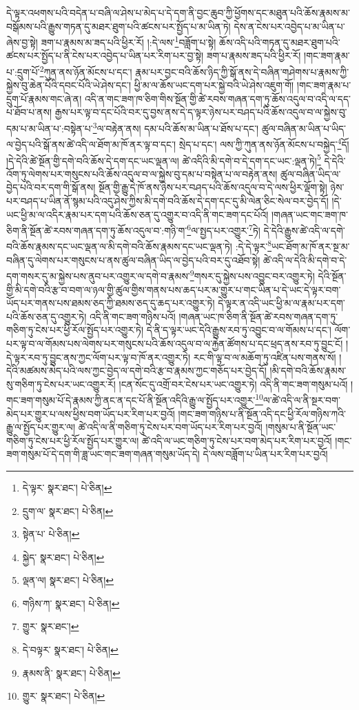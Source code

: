 དེ་ལྟར་འཕགས་པའི་བདེན་པ་བཞི་ལ་ཤེས་པ་མེད་པ་དེ་དག་ནི་བྱང་ཆུབ་ཀྱི་ཕྱོགས་དང་མཐུན་པའི་ཆོས་རྣམས་མ་བསྒོམས་པའི་རྒྱུས་གཏན་དུ་མཐར་ཐུག་པའི་ཚངས་པར་སྤྱོད་པ་མ་ཡིན་ཏེ། དེས་ན་ངེས་པར་འབྱེད་པ་མ་ཡིན་པ་ཞེས་བྱ་སྟེ། ཟག་པ་རྣམས་མ་ཟད་པའི་ཕྱིར་རོ། །:དེ་ལས་\footnote{དེ་ལྟར་  སྣར་ཐང་།  པེ་ཅིན། }བཟློག་པ་སྟེ། ཆོས་འདི་པའི་གཏན་དུ་མཐར་ཐུག་པའི་ཚངས་པར་སྤྱོད་པ་ནི་ངེས་པར་འབྱེད་པ་ཡིན་པར་རིག་པར་བྱ་སྟེ། ཟག་པ་རྣམས་ཟད་པའི་ཕྱིར་རོ། །གང་ཟག་རྣམ་པ་:དྲུག་པོ་\footnote{དྲུག་ལ་  སྣར་ཐང་།  པེ་ཅིན། }ཀུན་ནས་ཉོན་མོངས་པ་དང་། རྣམ་པར་བྱང་བའི་ཆོས་ཉིད་ཀྱི་སྒོ་ནས་དེ་བཞིན་གཤེགས་པ་རྣམས་ཀྱི་སྐྱེས་བུ་ཆེན་པོའི་དབང་པོའི་ཡེ་ཤེས་དང་། ཕྱི་མ་ལ་ཆོས་ཡང་དག་པར་སྐྱེ་བའི་ཡེ་ཤེས་འཇུག་གོ། །གང་ཟག་རྣམ་པ་དྲུག་པོ་རྣམས་གང་ཞེ་ན། འདི་ན་གང་ཟག་ཁ་ཅིག་གིས་སྔོན་གྱི་ཚེ་རབས་གཞན་དག་ཏུ་ཆོས་འདུལ་བ་འདི་ལ་དད་པ་ཐོབ་པ་ནས། རྒྱས་པར་ལྟ་བ་དང་པོའི་བར་དུ་བྱས་ནས་དེ་ད་ལྟར་ཉེས་པར་བཤད་པའི་ཆོས་འདུལ་བ་ལ་སྐྱེས་བུ་དམ་པ་མ་ཡིན་པ་:བསྟེན་པ་\footnote{སྟེན་པ་  པེ་ཅིན། }ལ་བརྟེན་ནས། དམ་པའི་ཆོས་མ་ཡིན་པ་ཐོས་པ་དང་། ཚུལ་བཞིན་མ་ཡིན་པ་ཡིད་ལ་བྱེད་པའི་སྒོ་ནས་ཚེ་འདི་ལ་ཐོག་མ་ཁོ་ནར་ལྟ་བ་དང་། སྲེད་པ་དང་། ལས་ཀྱི་ཀུན་ནས་ཉོན་མོངས་པ་བསྐྱེད་\footnote{སྐྱེད་  སྣར་ཐང་།  པེ་ཅིན། }དོ། །དེ་དེའི་ཚེ་སྔོན་གྱི་དགེ་བའི་ཆོས་དེ་དག་དང་ཡང་ལྡན་ལ། ཚེ་འདིའི་མི་དགེ་བ་དེ་དག་དང་ཡང་:ལྡན་ཏེ།\footnote{ལྡན་ལ།  སྣར་ཐང་།  པེ་ཅིན། } དེ་དེའི་འོག་ཏུ་ལེགས་པར་གསུངས་པའི་ཆོས་འདུལ་བ་ལ་སྐྱེས་བུ་དམ་པ་བསྟེན་པ་ལ་བརྟེན་ནས། ཚུལ་བཞིན་ཡིད་ལ་བྱེད་པའི་བར་དག་གི་སྒོ་ནས། སྔོན་གྱི་རྒྱུ་དེ་ཁོ་ནས་ཉེས་པར་བཤད་པའི་ཆོས་འདུལ་བ་དེ་ལས་ཕྱིར་ལྡོག་སྟེ། ཉེས་པར་བཤད་པ་ཡིན་ནོ་སྙམ་པའི་འདུ་ཤེས་ཀྱིས་མི་དགེ་བའི་ཆོས་དེ་དག་དང་དུ་མི་ལེན་ཅིང་སེལ་བར་བྱེད་དོ། །དེ་ཡང་ཕྱི་མ་ལ་འདིར་རྣམ་པར་དག་པའི་ཆོས་ཅན་དུ་འགྱུར་བ་འདི་ནི་གང་ཟག་དང་པོའོ། །གཞན་ཡང་གང་ཟག་ཁ་ཅིག་ནི་སྔོན་ཚེ་རབས་གཞན་དག་ཏུ་ཆོས་འདུལ་བ་:གཉི་ག་\footnote{གཉིས་ཀ་  སྣར་ཐང་།  པེ་ཅིན། }ལ་སྤྱད་པར་འགྱུར་\footnote{གྱུར་  སྣར་ཐང་། }ཏེ། དེ་དེའི་རྒྱུས་ཚེ་འདི་ལ་དགེ་བའི་ཆོས་རྣམས་དང་ཡང་ལྡན་ལ་མི་དགེ་བའི་ཆོས་རྣམས་དང་ཡང་ལྡན་ཏེ། :དེ་དེ་ལྟར་\footnote{དེ་བལྟར་  སྣར་ཐང་།  པེ་ཅིན། }ཡང་ཐོག་མ་ཁོ་ནར་སྔ་མ་བཞིན་དུ་ལེགས་པར་གསུངས་པ་ནས་ཚུལ་བཞིན་ཡིད་ལ་བྱེད་པའི་བར་དུ་འཐོབ་སྟེ། ཚེ་འདི་ལ་དེའི་མི་དགེ་བ་དེ་དག་གསར་དུ་མ་སྐྱེས་པས་ནུབ་པར་འགྱུར་ལ་དགེ་བ་རྣམས་\footnote{རྣམས་ནི་  སྣར་ཐང་།  པེ་ཅིན། }གསར་དུ་སྐྱེས་པས་འབྱུང་བར་འགྱུར་ཏེ། དེའི་སྔོན་གྱི་མི་དགེ་བའི་རྩ་བ་བག་ལ་ཉལ་གྱི་ཚུལ་གྱིས་གནས་པས་ཆད་པར་མ་གྱུར་པ་གང་ཡིན་པ་དེ་ཡང་དེ་ལྟར་བག་ཡོད་པར་གནས་པས་ཐམས་ཅད་ཀྱི་ཐམས་ཅད་དུ་ཆད་པར་འགྱུར་ཏེ། དེ་ལྟར་ན་འདི་ཡང་ཕྱི་མ་ལ་རྣམ་པར་དག་པའི་ཆོས་ཅན་དུ་འགྱུར་ཏེ། འདི་ནི་གང་ཟག་གཉིས་པའོ། །གཞན་ཡང་ཁ་ཅིག་ནི་སྔོན་ཚེ་རབས་གཞན་དག་ཏུ་གཅིག་ཏུ་ངེས་པར་ཕྱི་རོལ་སྤྱོད་པར་འགྱུར་ཏེ། དེ་ནི་ད་ལྟར་ཡང་དེའི་རྒྱུས་རབ་ཏུ་འབྱུང་བ་ལ་གོམས་པ་དང་། ལོག་པར་ལྟ་བ་ལ་གོམས་པས་ལེགས་པར་གསུངས་པའི་ཆོས་འདུལ་བ་ལ་རྐྱེན་ཚོགས་པ་དང་ཕྲད་ནས་རབ་ཏུ་བྱུང་ངོ། །དེ་ལྟར་རབ་ཏུ་བྱུང་ནས་ཀྱང་ལོག་པར་ལྟ་བ་ཁོ་ནར་འགྱུར་ཏེ། རང་གི་ལྟ་བ་ལ་མཆོག་ཏུ་འཛིན་པས་གནས་སོ། །དེའི་མཚམས་མེད་པའི་ལས་ཀྱང་བྱེད་ལ་དགེ་བའི་རྩ་བ་རྣམས་ཀྱང་གཅོད་པར་བྱེད་དོ། །མི་དགེ་བའི་ཆོས་རྣམས་སུ་གཅིག་ཏུ་ངེས་པར་ཡང་འགྱུར་རོ། །ངན་སོང་དུ་འགྲོ་བར་ངེས་པར་ཡང་འགྱུར་ཏེ། འདི་ནི་གང་ཟག་གསུམ་པའོ། །གང་ཟག་གསུམ་པོ་དེ་རྣམས་ཀྱི་ནང་ན་དང་པོ་ནི་སྔོན་འདིའི་རྒྱུ་ལ་སྤྱོད་པར་འགྱུར་\footnote{གྱུར་  སྣར་ཐང་།  པེ་ཅིན། }ལ་ཚེ་འདི་ལ་ནི་སྔར་བག་མེད་པར་གྱུར་པ་ལས་ཕྱིས་བག་ཡོད་པར་རིག་པར་བྱའོ། །གང་ཟག་གཉིས་པ་ནི་སྔོན་འདི་དང་ཕྱི་རོལ་གཉིས་ཀའི་རྒྱུ་ལ་སྤྱོད་པར་གྱུར་ལ། ཚེ་འདི་ལ་ནི་གཅིག་ཏུ་ངེས་པར་བག་ཡོད་པར་རིག་པར་བྱའོ། །གསུམ་པ་ནི་སྔོན་ཡང་གཅིག་ཏུ་ངེས་པར་ཕྱི་རོལ་སྤྱོད་པར་གྱུར་ལ། ཚེ་འདི་ལ་ཡང་གཅིག་ཏུ་ངེས་པར་བག་མེད་པར་རིག་པར་བྱའོ། །གང་ཟག་གསུམ་པོ་དེ་དག་གི་ཟླ་ཡང་གང་ཟག་གཞན་གསུམ་ཡོད་དེ། དེ་ལས་བཟློག་པ་ཡིན་པར་རིག་པར་བྱའོ། 